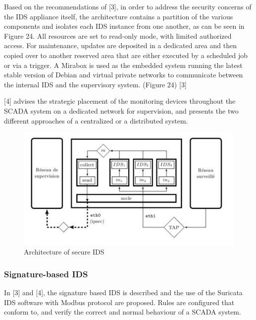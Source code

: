 \documentclass[11pt,]{article}
\begin{document}
Based on the recommendations of {[}3{]}, in order to address the
security concerns of the IDS appliance itself, the architecture contains
a partition of the various components and isolates each IDS instance
from one another, as can be seen in Figure 24. All resources are set to
read-only mode, with limited authorized access. For maintenance, updates
are deposited in a dedicated area and then copied over to another
reserved area that are either executed by a scheduled job or via a
trigger. A Mirabox is used as the embedded system running the latest
stable version of Debian and virtual private networks to communicate
between the internal IDS and the supervisory system. (Figure 24) {[}3{]}

{[}4{]} advises the strategic placement of the monitoring devices
throughout the SCADA system on a dedicated network for supervision, and
presents the two different approaches of a centralized or a distributed
system.

\clearpage

\begin{figure}[bottom]

{\centering \includegraphics{thesis_files/figure-latex/unnamed-chunk-35-1} 

}

\caption{Architecture of secure IDS }\label{fig:unnamed-chunk-35}
\end{figure}

\subsubsection{Signature-based IDS}\label{signature-based-ids}

In {[}3{]} and {[}4{]}, the signature based IDS is described and the use
of the Suricata IDS software with Modbus protocol are proposed. Rules
are configured that conform to, and verify the correct and normal
behaviour of a SCADA system.
\end{document}
